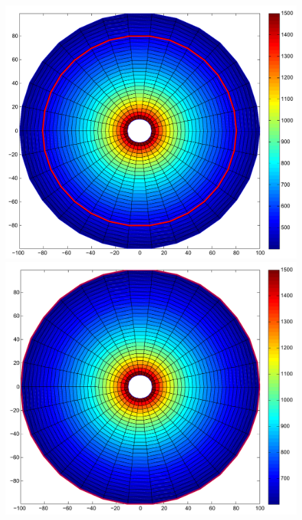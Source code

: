 \begin{figure}[!htb]
\endminipage\hfill
{}

  \includegraphics[width=1\textwidth]{figures/exp2-3.pdf}

\endminipage\hfill
{}

  \includegraphics[width=1\textwidth]{figures/exp2-4.pdf}

\endminipage\hfill
\end{figure}

